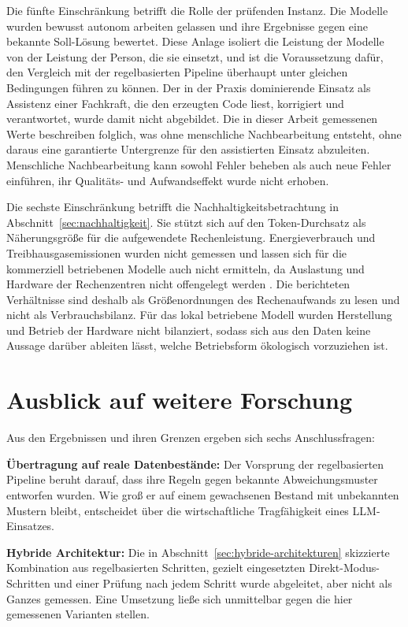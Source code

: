 Die fünfte Einschränkung betrifft die Rolle der prüfenden Instanz. Die Modelle wurden bewusst autonom arbeiten gelassen und ihre Ergebnisse gegen eine bekannte Soll-Lösung bewertet. Diese Anlage isoliert die Leistung der Modelle von der Leistung der Person, die sie einsetzt, und ist die Voraussetzung dafür, den Vergleich mit der regelbasierten Pipeline überhaupt unter gleichen Bedingungen führen zu können. Der in der Praxis dominierende Einsatz als Assistenz einer Fachkraft, die den erzeugten Code liest, korrigiert und verantwortet, wurde damit nicht abgebildet. Die in dieser Arbeit gemessenen Werte beschreiben folglich, was ohne menschliche Nachbearbeitung entsteht, ohne daraus eine garantierte Untergrenze für den assistierten Einsatz abzuleiten. Menschliche Nachbearbeitung kann sowohl Fehler beheben als auch neue Fehler einführen, ihr Qualitäts- und Aufwandseffekt wurde nicht erhoben.

Die sechste Einschränkung betrifft die Nachhaltigkeitsbetrachtung in Abschnitt~\ref{sec:nachhaltigkeit}. Sie stützt sich auf den Token-Durchsatz als Näherungsgröße für die aufgewendete Rechenleistung. Energieverbrauch und Treibhausgasemissionen wurden nicht gemessen und lassen sich für die kommerziell betriebenen Modelle auch nicht ermitteln, da Auslastung und Hardware der Rechenzentren nicht offengelegt werden \autocite{2026AIIndex,zhaoSurveyLargeLanguage2026}. Die berichteten Verhältnisse sind deshalb als Größenordnungen des Rechenaufwands zu lesen und nicht als Verbrauchsbilanz. Für das lokal betriebene Modell wurden Herstellung und Betrieb der Hardware nicht bilanziert, sodass sich aus den Daten keine Aussage darüber ableiten lässt, welche Betriebsform ökologisch vorzuziehen ist.

\section{Ausblick auf weitere Forschung}
\label{sec:ausblick}

Aus den Ergebnissen und ihren Grenzen ergeben sich sechs Anschlussfragen:

\noindent\textbf{Übertragung auf reale Datenbestände:} Der Vorsprung der regelbasierten Pipeline beruht darauf, dass ihre Regeln gegen bekannte Abweichungsmuster entworfen wurden. Wie groß er auf einem gewachsenen Bestand mit unbekannten Mustern bleibt, entscheidet über die wirtschaftliche Tragfähigkeit eines \ac{LLM}-Einsatzes.

\noindent\textbf{Hybride Architektur:} Die in Abschnitt~\ref{sec:hybride-architekturen} skizzierte Kombination aus regelbasierten Schritten, gezielt eingesetzten Direkt-Modus-Schritten und einer Prüfung nach jedem Schritt wurde abgeleitet, aber nicht als Ganzes gemessen. Eine Umsetzung ließe sich unmittelbar gegen die hier gemessenen Varianten stellen.


